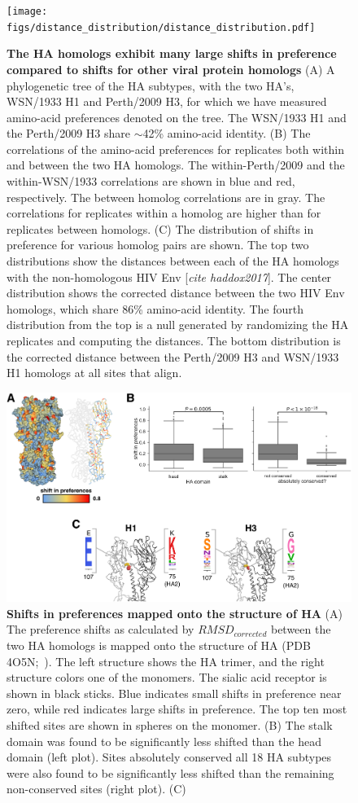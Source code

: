 \documentclass[9pt,twocolumn,twoside]{pnas-new}
\newcommand{\comment}[1]{{\color{red}[\textsl{#1}]}}
\begin{document}
\begin{figure}
\centering
\texttt{[image: figs/distance\_distribution/distance\_distribution.pdf]}
\caption{\label{fig:distance_distribution}
{\bf The HA homologs exhibit many large shifts in preference compared to shifts for other viral protein homologs}
(A) A phylogenetic tree of the HA subtypes, with the two HA's, WSN/1933 H1 and Perth/2009 H3, for which we have measured amino-acid preferences denoted on the tree. 
The WSN/1933 H1 and the Perth/2009 H3 share $\sim$42\% amino-acid identity.
(B) The correlations of the amino-acid preferences for replicates both within and between the two HA homologs. 
The within-Perth/2009 and the within-WSN/1933 correlations are shown in blue and red, respectively.
The between homolog correlations are in gray.
The correlations for replicates within a homolog are higher than for replicates between homologs.
(C) The distribution of shifts in preference for various homolog pairs are shown.
The top two distributions show the distances between each of the HA homologs with the non-homologous HIV Env \comment{cite haddox2017}. 
The center distribution shows the corrected distance between the two HIV Env homologs, which share 86\% amino-acid identity.
The fourth distribution from the top is a null generated by randomizing the HA replicates and computing the distances.
The bottom distribution is the corrected distance between the Perth/2009 H3 and WSN/1933 H1 homologs at all sites that align.
}
\end{figure}

\begin{figure}
\centering
\includegraphics[width=16cm]{figs/RMSD_heatmap/RMSD_heatmap.pdf}
\caption{\label{fig:RMSD_heatmap}
{\bf Shifts in preferences mapped onto the structure of HA}
(A) The preference shifts as calculated by $RMSD_{corrected}$ between the two HA homologs is mapped onto the structure of HA (PDB 4O5N;~\cite{lee2014receptor}). 
The left structure shows the HA trimer, and the right structure colors one of the monomers. 
The sialic acid receptor is shown in black sticks.
Blue indicates small shifts in preference near zero, while red indicates large shifts in preference.
The top ten most shifted sites are shown in spheres on the monomer.
(B) The stalk domain was found to be significantly less shifted than the head domain (left plot).
Sites absolutely conserved all 18 HA subtypes were also found to be significantly less shifted than the remaining non-conserved sites (right plot).
(C) 
}
\end{figure}
\end{document}
